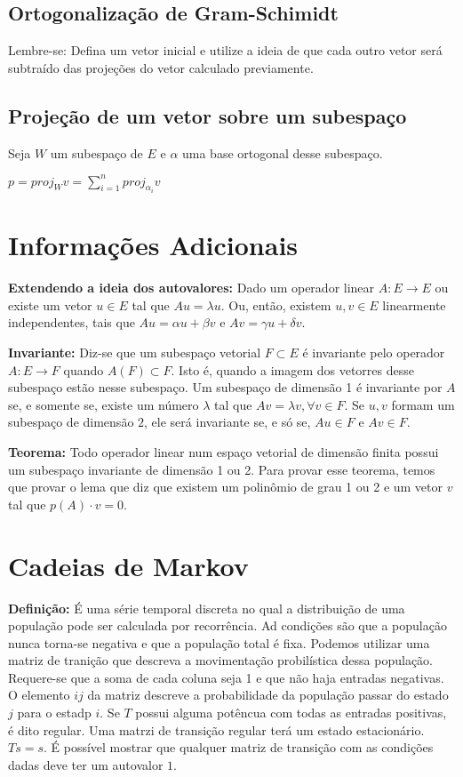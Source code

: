 \documentclass[12pt,letterpaper]{article}
\begin{document}
\subsection{Ortogonalização de Gram-Schimidt}

Lembre-se: Defina um vetor inicial e utilize a ideia de que cada outro vetor será subtraído das projeções do vetor
calculado previamente. 

\subsection{Projeção de um vetor sobre um subespaço}

Seja $W$ um subespaço de $E$ e $\alpha$ uma base ortogonal desse subespaço. 

$p = proj_W v = \sum_{i=1}^n proj_{\alpha_i} v $

\section{Informações Adicionais}

\textbf{Extendendo a ideia dos autovalores:} Dado um operador linear $A: E \to E$ ou existe um vetor $u \in E$ tal que $Au = \lambda u$. Ou, então, existem $u, v \in E$ linearmente independentes, tais que $Au = \alpha u + \beta v$ e $Av = \gamma u + \delta v$. 

\textbf{Invariante:} Diz-se que um subespaço vetorial $F \subset E$ é invariante pelo operador $A: E \to F$ quando $A(F) \subset F$. Isto é, quando a imagem dos vetorres desse subespaço estão nesse subespaço. Um subespaço de dimensão 1 é invariante por $A$ se, e somente se, existe um número $\lambda$ tal que $Av = \lambda v, \forall v \in F$. Se $u,v$ formam um subespaço de dimensão $2$, ele será invariante se, e só se, $Au \in F$ e $Av \in F$. 

\textbf{Teorema:} Todo operador linear num espaço vetorial de dimensão finita possui um subespaço invariante de dimensão 1 ou 2. Para provar esse teorema, temos que provar o lema que diz que existem um polinômio de grau 1 ou 2 e um vetor $v$ tal que $p(A)\cdot v = 0$. 

\section{Cadeias de Markov}

\textbf{Definição:} É uma série temporal discreta no qual a distribuição de uma população pode ser calculada por recorrência. Ad condições são que a população nunca torna-se negativa e que a população total é fixa. Podemos utilizar uma matriz de tranição que descreva a movimentação probilística dessa população. Requere-se que a soma de cada coluna seja 1 e que não haja entradas negativas. O elemento $ij$ da matriz descreve a probabilidade da população passar do estado $j$ para o estadp $i$. Se $T$ possui alguma potêncua com todas as entradas positivas, é dito regular. Uma matrzi de transição regular terá um estado estacionário. $Ts = s$. É possível mostrar que qualquer matriz de transição com as condições dadas deve ter um autovalor $1$.
\end{document}
